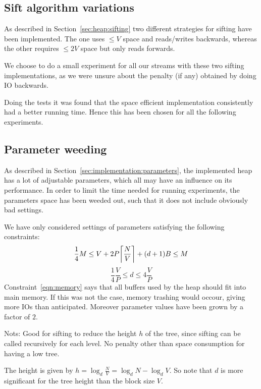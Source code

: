 
\subsection{Sift algorithm variations}
As described in Section~\ref{sec:heap:sifting} two different strategies for sifting have been implemented. The one uses $\leq V$ space and reads/writes backwards, whereas the other requires $\leq 2V$ space but only reads forwards.

We choose to do a small experiment for all our streams with these two sifting implementations, as we were unsure about the penalty (if any) obtained by doing IO backwards.

Doing the tests it was found that the space efficient implementation consistently had a better running time. Hence this has been chosen for all the following experiments.

\subsection{Parameter weeding}
As described in Section~\ref{sec:implementation:parameters}, the implemented heap has a lot of adjustable parameters, which all may have an influence on its performance. In order to limit the time needed for running experiments, the parameters space has been weeded out, such that it does not include obviously bad settings.

We have only considered settings of parameters satisfying the following constraints:
\begin{equation}
  \label{eqn:memory}
  \frac{1}{4}M \leq V + 2P \ceil*{\frac{N}{V}} + (d + 1)B \leq M
\end{equation}
\begin{equation}
  \label{eqn:fanout}
  \frac{1}{4} \frac{V}{P} \leq d \leq 4 \frac{V}{P}
\end{equation}
Constraint~\ref{eqn:memory} says that all buffers used by the heap should fit into main memory. If this was not the case, memory trashing would occour, giving more IOs than anticipated. Moreover parameter values have been grown by a factor of $2$.


Nots:
Good for sifting to reduce the height $h$ of the tree, since sifting can be called recursively for each level. No penalty other than space consumption for having a low tree.

The height is given by $h = \log_d{\frac{N}{V}} = \log_d{N} - \log_d{V}$. So note that $d$ is more significant for the tree height than the block size $V$.

